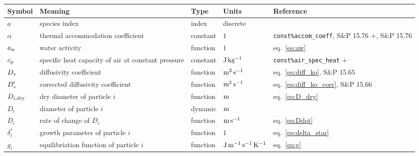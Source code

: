 \documentclass{article}
\begin{document}
\newcommand{\rr}{\raggedright}
\newcommand{\tn}{\tabularnewline\hline}
\renewcommand{\arraystretch}{1.5}
\begin{longtable}{|l|p{5.5cm}|l|l|p{4.5cm}|}
\hline \textbf{Symbol} & \textbf{Meaning}                                                       & \textbf{Type} & \textbf{Units}                        &  \textbf{Reference}                                \tn
\hline \endhead
$a$                    & \rr species index                                                      & index         & discrete                              &                                                    \tn
$\alpha$               & \rr thermal accommodation coefficient                                  & constant      & $1$                                   & \rr \verb+const%accom_coeff+, S\&P 15.76           \tn
$a_{\rm w}$            & \rr water activity                                                     & function      & $1$                                   & \rr eq.~\ref{eq:aw}                                \tn
$c_{\rm p}$            & \rr specific heat capacity of air at constant pressure                 & constant      & $\rm J \, kg^{-1}$                    & \rr \verb+const%air_spec_heat+                     \tn
$D_{\rm v}$            & \rr diffusivity coefficient                                            & function      & $\rm m^2 \, s^{-1}$                   & \rr eq.~\ref{eq:diff_ko}, S\&P 15.65               \tn
$D_{\rm v}'$           & \rr corrected diffusivity coefficient                                  & function      & $\rm m^2 \, s^{-1}$                   & \rr eq.~\ref{eq:diff_ko_corr}, S\&P 15.66          \tn
$D_{i,\rm dry}$        & \rr dry diameter of particle $i$                                       & function      & $\rm m$                               & \rr eq.~\ref{eq:D_dry}                             \tn
$D_i$                  & \rr diameter of particle $i$                                           & dynamic       & $\rm m$                               & \rr                                                \tn
$\dot{D}_i$            & \rr rate of change of $D_i$                                            & function      & $\rm m \, s^{-1}$                     & \rr eq.~\ref{eq:Ddot}                              \tn
$\delta_i^*$           & \rr growth parameter of particle $i$                                   & function      & $1$                                   & \rr eq.~\ref{eq:delta_star}                        \tn
$g_i$                  & \rr equilibriation function of particle $i$                            & function      & $\rm J \, m^{-1} \, s^{-1} \, K^{-1}$ & \rr eq.~\ref{eq:g}                                 \tn

\end{longtable}
\end{document}
